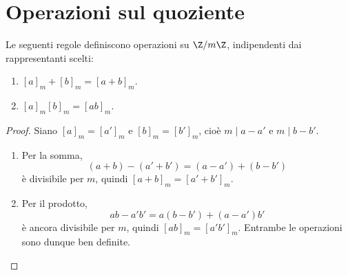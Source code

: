 \section{Operazioni sul quoziente}
\begin{proposizione}\label{prop:operazioni-modulari}
Le seguenti regole definiscono operazioni su $\Z/m\Z$, indipendenti dai rappresentanti scelti:
\begin{enumerate}[label=\arabic*.]
\item $[a]_m+[b]_m=[a+b]_m$.
\item $[a]_m[b]_m=[ab]_m$.
\end{enumerate}
\end{proposizione}
\begin{proof}
Siano $[a]_m=[a']_m$ e $[b]_m=[b']_m$, cioè $m\mid a-a'$ e $m\mid b-b'$. \begin{enumerate}[label=\arabic*.]
\item Per la somma,
\[
(a+b)-(a'+b')=(a-a')+(b-b')
\]
è divisibile per $m$, quindi $[a+b]_m=[a'+b']_m$.
\item Per il prodotto,
\[
ab-a'b'=a(b-b')+(a-a')b'
\]
è ancora divisibile per $m$, quindi $[ab]_m=[a'b']_m$. Entrambe le operazioni sono dunque ben definite.
\end{enumerate}
\end{proof}

